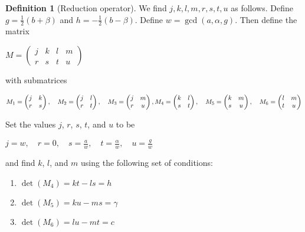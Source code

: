 \documentclass{article}
\theoremstyle{definition}
\newtheorem{definition}{Definition}[section]
\theoremstyle{theorem}
\theoremstyle{example}
\theoremstyle{corollary}
\begin{document}
\begin{definition}[Reduction operator]
We find \(j, k, l, m, r, s, t, u\) as follows. Define \(g = \frac{1}{2} (b + \beta)\) and \(h = - \frac{1}{2} (b - \beta)\). Define \(w = \gcd(a, \alpha, g)\). Then define the matrix
\begin{center}
\(M = \begin{pmatrix} j & k & l & m \\ r & s & t & u \end{pmatrix}\)
\end{center}
with submatrices
\begin{center}
\(M_{1} = \begin{pmatrix} j & k \\ r & s \end{pmatrix}, \quad M_{2} = \begin{pmatrix} j & l \\ r & t \end{pmatrix}, \quad M_{3} = \begin{pmatrix} j & m \\ r & u \end{pmatrix}, \\
\bigskip
M_{4} = \begin{pmatrix} k & l \\ s & t \end{pmatrix}, \quad M_{5} = \begin{pmatrix} k & m \\ s & u \end{pmatrix}, \quad M_{6} = \begin{pmatrix} l & m \\ t & u \end{pmatrix}\)
\end{center}

\bigskip

Set the values \(j\), \(r\), \(s\), \(t\), and \(u\) to be
\begin{center}
\(j = w, \quad r = 0, \quad s = \frac{a}{w}, \quad t = \frac{\alpha}{w}, \quad u = \frac{g}{w}\)
\end{center}
and find \(k\), \(l\), and \(m\) using the following set of conditions:
\begin{enumerate}
\item \(\det(M_{4}) = k t - l s = h\)
\item \(\det(M_{5}) = k u - ms = \gamma\)
\item \(\det(M_{6}) = l u - m t = c\)  
\end{enumerate}

\bigskip


\end{definition}
\end{document}
